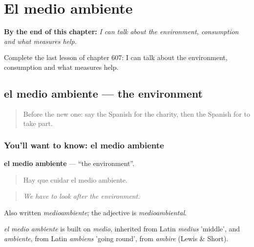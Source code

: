 
\chapter{El medio ambiente}
\label{ch:es-el-medio-ambiente}

\begin{chapteropening}
\textbf{By the end of this chapter:} \emph{I can talk about the environment, consumption and what measures help.}

Complete the last lesson of chapter 607: I can talk about the environment, consumption and what measures help.
\end{chapteropening}

\section[el medio ambiente]{el medio ambiente — the environment}

\label{lesson:ES-C607-medio-ambiente}



\begin{quote}
Before the new one: say the Spanish for the charity, then the Spanish for to take part.
\end{quote}

\subsection*{You'll want to know: el medio ambiente}
\textbf{el medio ambiente} — \textquotedblleft{}the environment\textquotedblright{}.

\begin{quote}
Hay que cuidar el medio ambiente.
\end{quote}

\begin{quote}
\emph{We have to look after the environment.}
\end{quote}

Also written \emph{medioambiente}; the adjective is \emph{medioambiental}.

\begin{cousinweb}
\emph{el medio ambiente} is built on \emph{medio}, inherited from Latin \emph{medius} 'middle', and \emph{ambiente}, from Latin \emph{ambiens} 'going round', from \emph{ambire} (Lewis \& Short).
\end{cousinweb}

